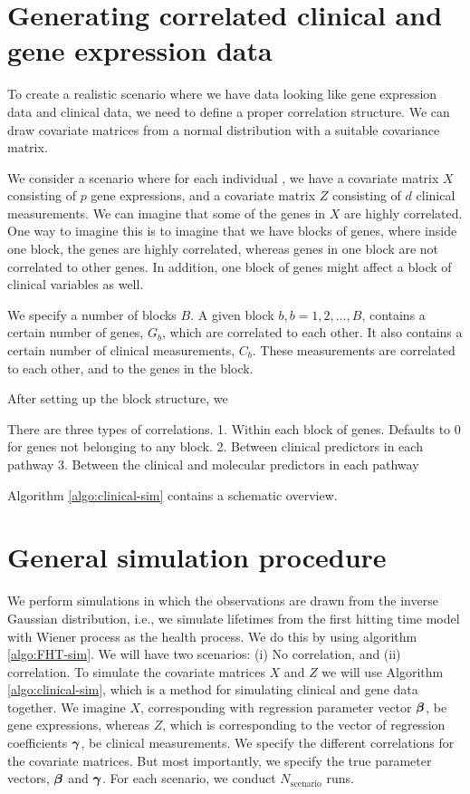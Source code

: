 \section{Generating correlated clinical and gene expression data}
To create a realistic scenario where we have data looking like gene expression data and clinical data, we need to define a proper correlation structure.
We can draw covariate matrices from a normal distribution with a suitable covariance matrix.

We consider a scenario where for each individual , we have a covariate matrix $X$ consisting of $p$ gene expressions, and a covariate matrix $Z$ consisting of $d$ clinical measurements.
We can imagine that some of the genes in $X$ are highly correlated.
One way to imagine this is to imagine that we have blocks of genes,
where inside one block, the genes are highly correlated, whereas genes in one block are not correlated to other genes.
In addition, one block of genes might affect a block of clinical variables as well.

We specify a number of blocks $B$. A given block $b,b=1,2,\ldots,B$, contains a certain number of genes, $G_b$, which are correlated to each other.
It also contains a certain number of clinical measurements, $C_b$. These measurements are correlated to each other, and to the genes in the block.

After setting up the block structure, we 

There are three types of correlations.
1. Within each block of genes. Defaults to 0 for genes not belonging to any block.
2. Between clinical predictors in each pathway
3. Between the clinical and molecular predictors in each pathway

Algorithm \ref{algo:clinical-sim} contains a schematic overview.


\section{General simulation procedure}
We perform simulations in which the observations are drawn from the inverse Gaussian distribution, i.e., we simulate lifetimes from the first hitting time model with Wiener process as the health process.
We do this by using algorithm \ref{algo:FHT-sim}.
We will have two scenarios:
(i) No correlation, and (ii) correlation.
To simulate the covariate matrices $X$ and $Z$ we will use Algorithm \ref{algo:clinical-sim}, which is a method for simulating clinical and gene data together.
We imagine $X$, corresponding with regression parameter vector $\boldsymbol{\beta}$, be gene expressions, whereas $Z$, which is corresponding to the vector of regression coefficients $\boldsymbol{\gamma}$, be clinical measurements.
We specify the different correlations for the covariate matrices.
But most importantly, we specify the true parameter vectors, $\boldsymbol{\beta}$ and $\boldsymbol{\gamma}$.
For each scenario, we conduct $N_{\text{scenario}}$ runs.

